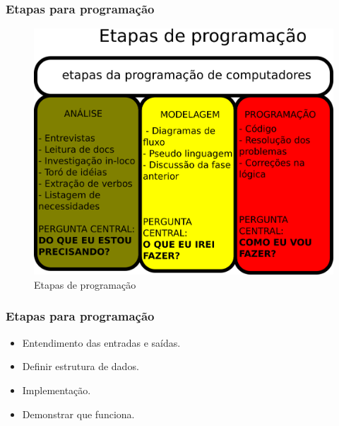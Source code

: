 \begin{frame}
	\frametitle{Etapas para programação}
	\begin{figure}
		\centering
		\includegraphics[width=0.6\linewidth]{images/etapasDeProgramacao}
		\caption{Etapas de programação}
		\label{fig:etapasdeprogramacao}
	\end{figure}
\end{frame}

\begin{frame}
	\frametitle{Etapas para programação}
	\begin{itemize}
		\item Entendimento das entradas e saídas.
		\item Definir estrutura de dados.
		\item Implementação.
		\item Demonstrar que funciona.
	\end{itemize}
\end{frame}


